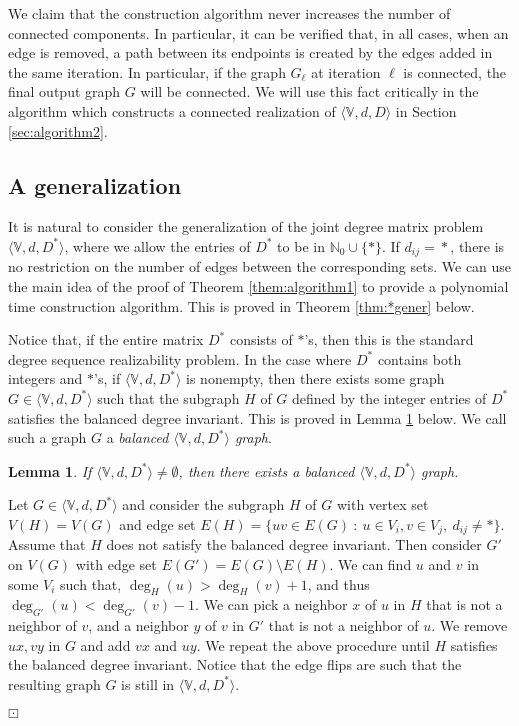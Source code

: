 \documentclass[12pt,a4paper]{article}
\theoremstyle{definition}
\theoremstyle{plain}
\newtheorem{lemma}[dfn]{Lemma}
\newenvironment{prf}{\noindent {\bf Proof.}}{\begin{flushright}\vspace{-2em}\footnotesize$\boxdot$\normalsize\end{flushright}\smallskip}
\begin{document}
 We claim that the construction algorithm
never increases the number of connected components.
In particular, it can be verified that, in all cases, when
an edge is removed, a path between its endpoints is created 
by the edges added in the same iteration.
In particular, if the graph $G_{\ell}$ at iteration $\ell$ is connected,
the final output graph $G$ will be connected.
We will use this fact critically in the algorithm
which constructs a connected realization of $\langle{\mathbb V},d,D\rangle$ 
in Section \ref{sec:algorithm2}.



\subsection*{A generalization}
\label{sec:Generalizations}



It is natural to consider the generalization of the joint degree matrix problem 
$\langle \mathbb V, d, D^*\rangle$, where we allow 
the entries of $D^*$ to be in ${\mathbb N_0} \cup \{ * \}$. 
If $d_{ij} \! = \! *$, there is no restriction on the number of edges
between the corresponding sets.
We can use the 
main idea of the proof of Theorem \ref{them:algorithm1}
to provide a polynomial time construction algorithm.
This is proved in Theorem \ref{thm:*gener} below.

Notice that, if the entire matrix $D^*$ consists of $*$'s,
then this is the standard degree sequence realizability problem.
In the case where $D^*$ contains both integers and $*$'s, if $\langle \mathbb V, d, D^*\rangle$ is nonempty, 
then there exists some graph
$G\in\langle \mathbb V, d, D^*\rangle$ such that the subgraph $H$ of $G$ defined
by the integer entries of $D^*$ satisfies the balanced degree invariant. This is proved in Lemma \ref{lem:last} below.
We call such a graph $G$
a \emph{balanced $\langle \mathbb V, d, D^*\rangle$ graph}.

\begin{lemma}
\label{lem:last}
If $\langle \mathbb V, d, D^*\rangle\neq \emptyset$, then there exists a
balanced $\langle \mathbb V, d, D^*\rangle$ graph.
\end {lemma}
\begin{prf}
Let $G\in \langle \mathbb V, d, D^*\rangle$ and consider the subgraph $H$ of $G$
with vertex set $V(H)=V(G)$ and edge set
$E(H)=\{uv\in E(G)\::\: u\in V_i, v\in V_j,\: d_{ij}\neq *\}$. Assume that $H$
does not satisfy the balanced degree invariant. 
Then consider $G'$ on $V(G)$ with edge set
$E(G')=E(G)\setminus E(H)$. We can find $u$ and $v$ in some $V_i$ such that,
$\deg_{H}(u)> \deg_{H}(v) + 1$, and thus $\deg_{G'}(u)< \deg_{G'}(v) -1 $. 
We can pick
a neighbor $x$ of $u$ in $H$ that is not a neighbor of $v$, 
and a neighbor $y$
of $v$ in $G'$ that is not a neighbor of $u$. 
We remove $ux, vy$ in $G$ and add
$vx$ and $uy$. 
We repeat the above procedure until $H$ satisfies the balanced
degree invariant. 
Notice that the edge flips are such that the resulting graph
$G$ is still in $\langle \mathbb V, d, D^*\rangle$.
\end{prf}
\end{document}

